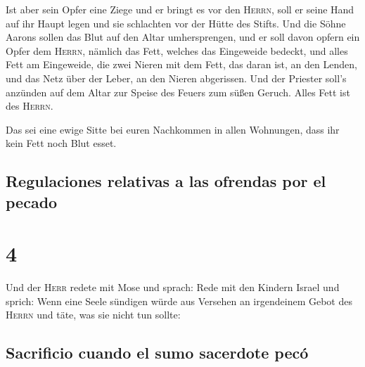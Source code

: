  Ist aber sein Opfer eine Ziege und er bringt es vor den
\textsc{Herrn},  soll er seine Hand auf ihr Haupt legen
und sie schlachten vor der Hütte des Stifts. Und die Söhne Aarons sollen
das Blut auf den Altar umhersprengen,  und er soll davon
opfern ein Opfer dem \textsc{Herrn}, nämlich das Fett, welches das
Eingeweide bedeckt, und alles Fett am Eingeweide,  die
zwei Nieren mit dem Fett, das daran ist, an den Lenden, und das Netz
über der Leber, an den Nieren abgerissen.  Und der
Priester soll's anzünden auf dem Altar zur Speise des Feuers zum süßen
Geruch. Alles Fett ist des \textsc{Herrn}.

 Das sei eine ewige Sitte bei euren Nachkommen in allen
Wohnungen, dass ihr kein Fett noch Blut esset.

\hypertarget{regulaciones-relativas-a-las-ofrendas-por-el-pecado}{%
\subsection{Regulaciones relativas a las ofrendas por el
pecado}\label{regulaciones-relativas-a-las-ofrendas-por-el-pecado}}

\hypertarget{section-3}{%
\section{4}\label{section-3}}

 Und der \textsc{Herr} redete mit Mose und sprach:
 Rede mit den Kindern Israel und sprich: Wenn eine Seele
sündigen würde aus Versehen an irgendeinem Gebot des \textsc{Herrn} und
täte, was sie nicht tun sollte:

\hypertarget{sacrificio-cuando-el-sumo-sacerdote-pecuxf3}{%
\subsection{Sacrificio cuando el sumo sacerdote
pecó}\label{sacrificio-cuando-el-sumo-sacerdote-pecuxf3}}

